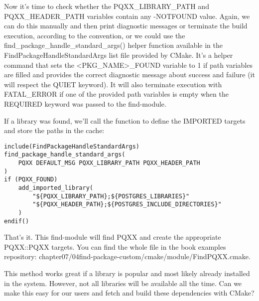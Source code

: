 Now it's time to check whether the PQXX\_LIBRARY\_PATH and PQXX\_HEADER\_PATH variables contain any -NOTFOUND value. Again, we can do this manually and then print diagnostic messages or terminate the build execution, according to the convention, or we could use the find\_package\_handle\_standard\_args() helper function available in the FindPackageHandleStandardArgs list file provided by CMake. It's a helper command that sets the <PKG\_NAME>\_FOUND variable to 1 if path variables are filled and provides the correct diagnostic message about success and failure (it will respect the QUIET keyword). It will also terminate execution with FATAL\_ERROR if one of the provided path variables is empty when the REQUIRED keyword was passed to the find-module.

If a library was found, we'll call the function to define the IMPORTED targets and store the paths in the cache:

\begin{lstlisting}[style=styleCMake]
include(FindPackageHandleStandardArgs)
find_package_handle_standard_args(
	PQXX DEFAULT_MSG PQXX_LIBRARY_PATH PQXX_HEADER_PATH
)
if (PQXX_FOUND)
	add_imported_library(
		"${PQXX_LIBRARY_PATH};${POSTGRES_LIBRARIES}"
		"${PQXX_HEADER_PATH};${POSTGRES_INCLUDE_DIRECTORIES}"
	)
endif()
\end{lstlisting}

That's it. This find-module will find PQXX and create the appropriate PQXX::PQXX targets. You can find the whole file in the book examples repository: chapter07/04find-package-custom/cmake/module/FindPQXX.cmake.

This method works great if a library is popular and most likely already installed in the system. However, not all libraries will be available all the time. Can we make this easy for our users and fetch and build these dependencies with CMake?




























